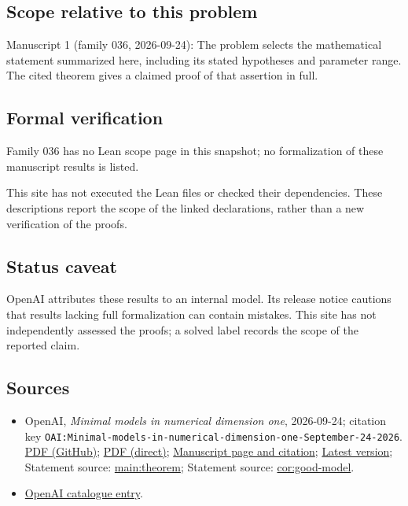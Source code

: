 \documentclass[11pt]{article}
\begin{document}
\subsection{Scope relative to this problem}
Manuscript 1 (family 036, 2026-09-24): The problem selects the mathematical statement summarized here, including its stated hypotheses and parameter range. The cited theorem gives a claimed proof of that assertion in full.

\subsection{Formal verification}
Family 036 has no Lean scope page in this snapshot; no formalization of these manuscript results is listed.

This site has not executed the Lean files or checked their dependencies. These descriptions report the scope of the linked declarations, rather than a new verification of the proofs.

\subsection{Status caveat}
OpenAI attributes these results to an internal model. Its release notice cautions that results lacking full formalization can contain mistakes. This site has not independently assessed the proofs; a solved label records the scope of the reported claim.

\subsection{Sources}
\begin{itemize}
\item OpenAI, \emph{Minimal models in numerical dimension one}, 2026-09-24; citation key \texttt{OAI:Minimal-models-in-numerical-dimension-one-September-24-2026}. \href{https://github.com/openai/math/blob/adc7f1241b42e322a6451854ab7e4b4c146bf78a/preprints/Minimal-models-in-numerical-dimension-one-September-24-2026/paper.pdf}{PDF (GitHub)}; \href{https://github.com/openai/math/raw/adc7f1241b42e322a6451854ab7e4b4c146bf78a/preprints/Minimal-models-in-numerical-dimension-one-September-24-2026/paper.pdf}{PDF (direct)}; \href{https://github.com/openai/math/blob/adc7f1241b42e322a6451854ab7e4b4c146bf78a/preprints/Minimal-models-in-numerical-dimension-one-September-24-2026/README.md}{Manuscript page and citation}; \href{https://github.com/openai/math/blob/main/preprints/Minimal-models-in-numerical-dimension-one-September-24-2026/paper.pdf}{Latest version}; Statement source: \href{https://github.com/openai/math/blob/adc7f1241b42e322a6451854ab7e4b4c146bf78a/preprints/Minimal-models-in-numerical-dimension-one-September-24-2026/build/sections/introduction.tex\#L51}{main:theorem}; Statement source: \href{https://github.com/openai/math/blob/adc7f1241b42e322a6451854ab7e4b4c146bf78a/preprints/Minimal-models-in-numerical-dimension-one-September-24-2026/build/sections/introduction.tex\#L84}{cor:good-model}.
\item \href{https://github.com/openai/math/blob/adc7f1241b42e322a6451854ab7e4b4c146bf78a/CONTENTS.md}{OpenAI catalogue entry}.
\end{itemize}
\end{document}
